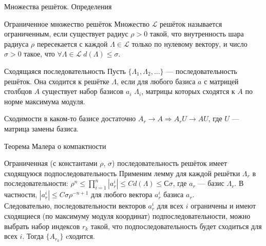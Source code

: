 \documentclass[10pt]{beamer}
\begin{document}
\begin{frame}{Множества решёток. Определения}

\begin{block}{Ограниченное множество решёток}
    Множество $\mathcal{L}$ решёток называется ограниченным, если существует радиус $\rho > 0$ такой, что внутренность шара радиуса $\rho$ пересекается с каждой $\Lambda \in \mathcal{L}$ только по нулевому вектору, и число $\sigma > 0$ такое, что $\forall \Lambda \in \mathcal{L}\; d(\Lambda) \leq \sigma$.
\end{block}

\begin{block}{Сходящаяся последовательность}
    Пусть $\{\Lambda_1,\Lambda_2,\ldots\}$ --- последовательность решёток. Она сходится к решётке $\Lambda$, если для любого базиса $a$ с матрицей столбцов $A$ существует набор базисов $a_i$ $\Lambda_i$, матрицы которых сходятся к $A$ по норме максимума модуля.
\end{block}

\begin{block}{Сходимости в каком-то базисе достаточно}
    $A_r \rightarrow A \Rightarrow A_rU \rightarrow AU$, где $U$ --- матрица замены базиса.
\end{block}

\end{frame}

\begin{frame}{Теорема Малера о компактности}

\begin{block}{Ограниченная (с константами $\rho$, $\sigma$) последовательность решёток имеет сходящуюся подпоследовательность}
    Применим лемму для каждой решётки $\Lambda_r$ в последовательности: $\rho^n \leq \prod_{i=1}^n{\left|a_r^i\right|} \leq Cd(\Lambda) \leq С\sigma$, где $a_r$ --- базис $\Lambda_r$. В частности, $\left|a_r^i\right| \leq C\sigma\rho^{-n + 1}$ для любого вектора $a_r^i$ базиса $a_r$.\\
\vspace{0.4cm}
    Следовательно, последовательности векторов $a_r^i$ для всех $i$ ограничены и имеют сходящиеся (по максимуму модуля координат) подпоследовательности, можно выбрать набор индексов $r_k$ такой, что подпоследовательность будет сходиться для всех $i$. Тогда $\{A_{r_k}\}$ cходится.
\end{block}

\end{frame}
\end{document}
